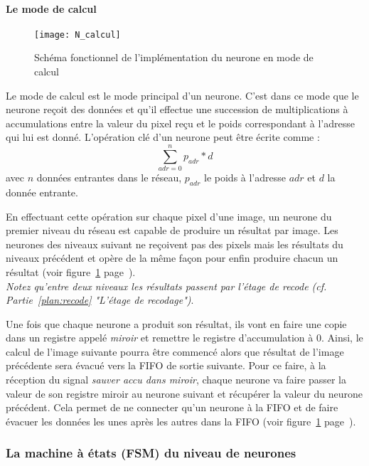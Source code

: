 	\paragraph{Le mode de calcul\\}
	\begin{figure}[h!]
		\begin{center}
			\texttt{[image: N\_calcul]}
			\caption{Schéma fonctionnel de l'implémentation du neurone en mode de calcul}
			\label{fig:N_calcul}
		\end{center}
	\end{figure}

	Le mode de calcul est le mode principal d'un neurone. C'est dans ce mode que le neurone
	reçoit des données et qu'il effectue une succession de multiplications à accumulations entre
	la valeur du pixel reçu et le poids correspondant à l'adresse qui lui est donné. L'opération clé
	d'un neurone peut être écrite comme :
	$$\sum_{adr=0}^n p_{adr}*d$$
	avec $n$ données entrantes dans le réseau, $p_{adr}$ le poids à l'adresse $adr$
	et $d$ la donnée entrante.

	En effectuant cette opération sur chaque pixel d'une image, un neurone du premier niveau du réseau
	est capable de produire un résultat par image. Les neurones des niveaux suivant ne reçoivent
	pas des pixels mais les résultats du niveaux précédent et opère de la même façon pour enfin
	produire chacun un résultat (voir figure~\ref{fig:N_calcul} page~\pageref{fig:N_calcul}).
	\\{\em Notez qu'entre deux niveaux les résultats passent par l'étage de recode
	(cf. Partie~\ref{plan:recode} "L'étage de recodage")}.

	Une fois que chaque neurone a produit son résultat, ils vont en faire une copie dans
	un registre appelé {\em miroir} et remettre le registre d'accumulation à 0. Ainsi,
	le calcul de l'image suivante pourra être commencé alors que résultat de l'image précédente
	sera évacué vers la FIFO de sortie suivante. Pour ce faire, à la réception du signal
	{\em sauver accu dans miroir}, chaque neurone va faire passer la valeur de son
	registre miroir au neurone suivant et récupérer la valeur du neurone précédent.
	Cela permet de ne connecter qu'un neurone à la FIFO
	et de faire évacuer les données les unes après les autres dans la FIFO
	(voir figure~\ref{fig:N_calcul} page~\pageref{fig:N_calcul}).

\subsubsection{La machine à états (FSM) du niveau de neurones}

